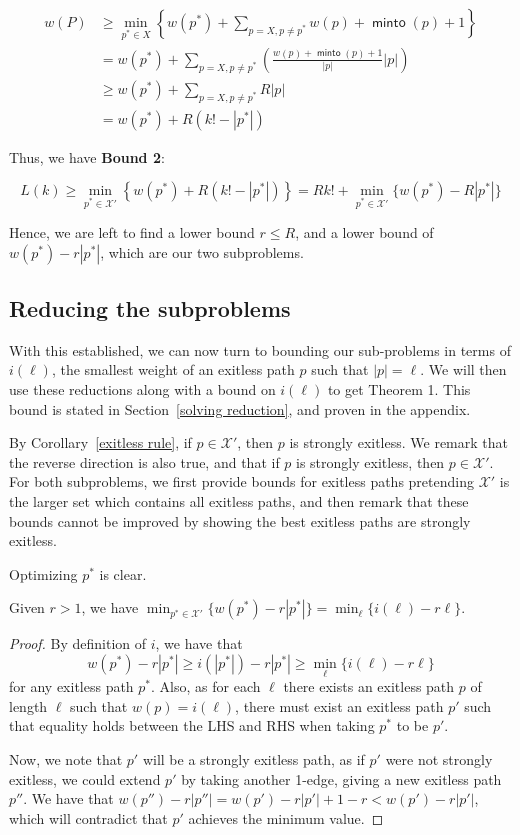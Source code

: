 \documentclass{article}
\DeclareMathOperator{\minto}{\bm{\mathsf{minto}}}
\newcommand{\edit}[1]{}%
\newcommand{\dc}[1]{}%
\begin{document}
\begin{align*}
    w(P)  &\geq \min_{p^* \in X}\left\{ w(p^*) + \sum_{p = X, p \neq p^*} w(p)+\minto(p)+1\right\}\\
    &= w(p^*) + \sum_{p = X, p \neq p^*} \left(\frac{w(p)+\minto(p)+1}{|p|}|p|\right)\\
    &\geq w(p^*) + \sum_{p = X, p \neq p^*} R |p|\\ 
    &= w(p^*) + R(k!-|p^*|)
\end{align*}

Thus, we have \textbf{Bound 2}:

\[ L(k) \geq \min_{p^* \in \mathcal{X}'}\left\{w(p^*) + R(k!-|p^*|) \right\} = Rk! + \min_{p^* \in \mathcal{X}'}\{w(p^*)-R|p^*|\} \]

Hence, we are left to find a lower bound $r \leq R$, and a lower bound of $w(p^*) - r|p^*|$, which are our two subproblems.

\subsection{Reducing the subproblems} \label{reducing subproblems}

With this established, we can now turn to bounding our sub-problems in terms of $i(\ell)$, the smallest weight of an exitless path $p$ such that $|p|= \ell$. We will then use these reductions along with a bound on $i(\ell)$ to get Theorem 1. This bound is stated in Section~\ref{solving reduction}, and proven in the appendix.\edit{ ref}

By Corollary~\ref{exitless rule}, if $p \in \mathcal{X}'$, then $p$ is strongly exitless. We remark that the reverse direction is also true, and that if $p$ is strongly exitless, then $p \in \mathcal{X}'$.\dc{ Just state that $\mathcal{X}'$ is exactly the set of strongly exitless paths, but do this in the previous section when you define $\mathcal{X}'$} For both subproblems, we first provide bounds for exitless paths pretending $\mathcal{X}'$ is the larger set which contains all exitless paths, and then remark that these bounds cannot be improved by showing the best exitless paths are strongly exitless.


\vspace{.75em}
Optimizing $p^*$ is clear.
\begin{red} Given $r > 1$, we have $\min_{p^* \in \mathcal{X}'}\{w(p^*)-r|p^*|\} = \min_{\ell}\{i(\ell)-r\ell\}$.
\begin{proof}
By definition of $i$, we have that \[w(p^*)-r|p^*| \geq i(|p^*|)-r|p^*| \geq \min_{\ell}\{i(\ell)-r\ell\}\] for any exitless path $p^*$. Also, as for each $\ell$ there exists an exitless path $p$ of length $\ell$ such that $w(p) = i(\ell)$, there must exist an exitless path $p'$ such that equality holds between the LHS and RHS when taking $p^*$ to be $p'$. 

Now, we note that $p'$ will be a strongly exitless path, as if $p'$ were not strongly exitless, we could extend $p'$ by taking another 1-edge, giving a new exitless path $p''$. We have that $w(p'') -r|p''| = w(p')-r|p'|+1-r<w(p')-r|p'|$, which will contradict that $p'$ achieves the minimum value.  \end{proof}\end{red}
\end{document}
